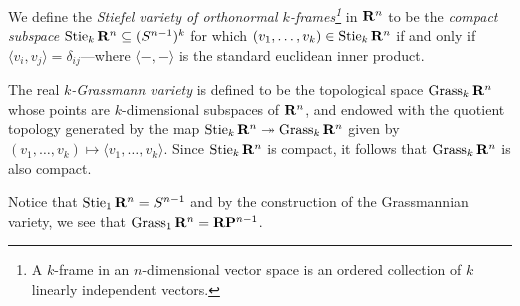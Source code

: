 \begin{definition}
\label{def:stiefel-variety}
We define the \emph{Stiefel variety of orthonormal \(k\)-frames\footnote{ A
    \(k\)-frame in an \(n\)-dimensional vector space is an ordered collection of
    \(k\) linearly independent vectors.  }} in \(\mathbf{R}^n\) to be the \emph{compact
  subspace} \(\operatorname{Stie}_k \mathbf{R}^n \subseteq (S^{n-1})^k\) for which
\((v_1, \dots, v_k) \in \operatorname{Stie}_k \mathbf{R}^n\) if and only if
\(\langle v_i, v_j \rangle = \delta_{ij}\)---where \(\langle -, - \rangle\) is
the standard euclidean inner product.
\end{definition}

\begin{definition}
\label{def:grassmann-variety}
The real \emph{\(k\)-Grassmann variety} is defined to be the topological space
\(\operatorname{Grass}_k \mathbf{R}^n\) whose points are \(k\)-dimensional subspaces of \(\mathbf{R}^n\), and
endowed with the quotient topology generated by the map
\(\operatorname{Stie}_k \mathbf{R}^n \twoheadrightarrow \operatorname{Grass}_k \mathbf{R}^n\) given by
\((v_1, \dots, v_k) \mapsto \langle v_1, \dots, v_k \rangle\). Since
\(\operatorname{Stie}_k \mathbf{R}^n\) is compact, it follows that \(\operatorname{Grass}_k \mathbf{R}^n\) is also compact.
\end{definition}

\begin{example}
\label{exp:grassmanian-projective-space}
Notice that \(\operatorname{Stie}_1 \mathbf{R}^n = S^{n-1}\) and by the construction of the
Grassmannian variety, we see that \(\operatorname{Grass}_1 \mathbf{R}^n = \mathbf{R} \mathbf{P}^{n-1}\).
\end{example}

